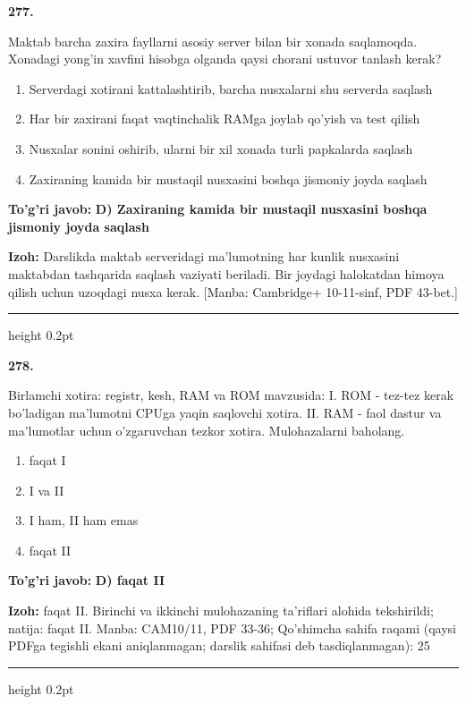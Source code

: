 \documentclass[10pt,a4paper]{article}
\begin{document}
{\bfseries\sffamily\color{ink} 277.}
\par
Maktab barcha zaxira fayllarni asosiy server bilan bir xonada saqlamoqda. Xonadagi yong'in xavfini hisobga olganda qaysi chorani ustuvor tanlash kerak?
\begin{enumerate}[label=\Alph*),leftmargin=9mm]
\item Serverdagi xotirani kattalashtirib, barcha nusxalarni shu serverda saqlash
\item Har bir zaxirani faqat vaqtinchalik RAMga joylab qo'yish va test qilish
\item Nusxalar sonini oshirib, ularni bir xil xonada turli papkalarda saqlash
\item Zaxiraning kamida bir mustaqil nusxasini boshqa jismoniy joyda saqlash
\end{enumerate}
\begin{tcolorbox}[enhanced,breakable,colback=teal!4,colframe=teal!60!black,boxrule=0.45pt,arc=1.2mm,left=2.7mm,right=2.7mm,top=1.8mm,bottom=1.8mm,before skip=2mm,after skip=2mm]
{\bfseries\sffamily\color{teal}To'g'ri javob:} \textbf{D) Zaxiraning kamida bir mustaqil nusxasini boshqa jismoniy joyda saqlash}
\par\smallskip
{\bfseries Izoh:} Darslikda maktab serveridagi ma'lumotning har kunlik nusxasini maktabdan tashqarida saqlash vaziyati beriladi. Bir joydagi halokatdan himoya qilish uchun uzoqdagi nusxa kerak. [Manba: Cambridge+ 10-11-sinf, PDF 43-bet.]
\end{tcolorbox}
\vspace{2mm}\hrule height 0.2pt\vspace{3mm}

{\bfseries\sffamily\color{ink} 278.}
\par
Birlamchi xotira: registr, kesh, RAM va ROM mavzusida: I. ROM - tez-tez kerak bo'ladigan ma'lumotni CPUga yaqin saqlovchi xotira. II. RAM - faol dastur va ma'lumotlar uchun o'zgaruvchan tezkor xotira. Mulohazalarni baholang.
\begin{enumerate}[label=\Alph*),leftmargin=9mm]
\item faqat I
\item I va II
\item I ham, II ham emas
\item faqat II
\end{enumerate}
\begin{tcolorbox}[enhanced,breakable,colback=teal!4,colframe=teal!60!black,boxrule=0.45pt,arc=1.2mm,left=2.7mm,right=2.7mm,top=1.8mm,bottom=1.8mm,before skip=2mm,after skip=2mm]
{\bfseries\sffamily\color{teal}To'g'ri javob:} \textbf{D) faqat II}
\par\smallskip
{\bfseries Izoh:} faqat II. Birinchi va ikkinchi mulohazaning ta'riflari alohida tekshirildi; natija: faqat II. Manba: CAM10/11, PDF 33-36; Qo'shimcha sahifa raqami (qaysi PDFga tegishli ekani aniqlanmagan; darslik sahifasi deb tasdiqlanmagan): 25
\end{tcolorbox}
\vspace{2mm}\hrule height 0.2pt\vspace{3mm}
\end{document}
